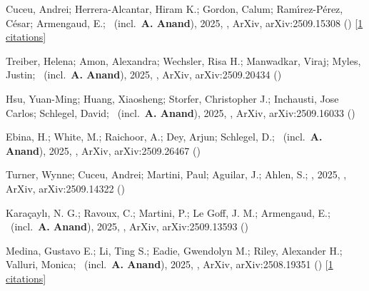 \item[{\color{numcolor}\scriptsize14}] Cuceu, Andrei; Herrera-Alcantar, Hiram K.; Gordon, Calum; Ram{\'\i}rez-P{\'e}rez, C{\'e}sar; Armengaud, E.; \etal\ (incl.\ \textbf{A. Anand}), 2025, , ArXiv, arXiv:2509.15308 () [\href{https://ui.adsabs.harvard.edu/abs/2025arXiv250915308C}{1 citations}]

\item[{\color{numcolor}\scriptsize13}] Treiber, Helena; Amon, Alexandra; Wechsler, Risa H.; Manwadkar, Viraj; Myles, Justin; \etal\ (incl.\ \textbf{A. Anand}), 2025, , ArXiv, arXiv:2509.20434 ()

\item[{\color{numcolor}\scriptsize12}] Hsu, Yuan-Ming; Huang, Xiaosheng; Storfer, Christopher J.; Inchausti, Jose Carlos; Schlegel, David; \etal\ (incl.\ \textbf{A. Anand}), 2025, , ArXiv, arXiv:2509.16033 ()

\item[{\color{numcolor}\scriptsize11}] Ebina, H.; White, M.; Raichoor, A.; Dey, Arjun; Schlegel, D.; \etal\ (incl.\ \textbf{A. Anand}), 2025, , ArXiv, arXiv:2509.26467 ()

\item[{\color{numcolor}\scriptsize10}] Turner, Wynne; Cuceu, Andrei; Martini, Paul; Aguilar, J.; Ahlen, S.; \etal, 2025, , ArXiv, arXiv:2509.14322 ()

\item[{\color{numcolor}\scriptsize9}] Kara{\c{c}}ayl{\i}, N. G.; Ravoux, C.; Martini, P.; Le Goff, J. M.; Armengaud, E.; \etal\ (incl.\ \textbf{A. Anand}), 2025, , ArXiv, arXiv:2509.13593 ()

\item[{\color{numcolor}\scriptsize8}] Medina, Gustavo E.; Li, Ting S.; Eadie, Gwendolyn M.; Riley, Alexander H.; Valluri, Monica; \etal\ (incl.\ \textbf{A. Anand}), 2025, , ArXiv, arXiv:2508.19351 () [\href{https://ui.adsabs.harvard.edu/abs/2025arXiv250819351M}{1 citations}]

